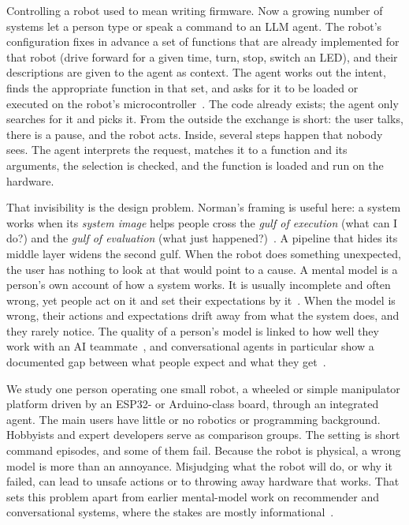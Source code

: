 \documentclass[sigconf]{acmart}
\begin{document}
Controlling a robot used to mean writing firmware. Now a growing number of systems let a person type or speak a command to an LLM agent. The robot's configuration fixes in advance a set of functions that are already implemented for that robot (drive forward for a given time, turn, stop, switch an LED), and their descriptions are given to the agent as context. The agent works out the intent, finds the appropriate function in that set, and asks for it to be loaded or executed on the robot's microcontroller~\cite{ahn2022saycan, vemprala2024chatgpt}. The code already exists; the agent only searches for it and picks it. From the outside the exchange is short: the user talks, there is a pause, and the robot acts. Inside, several steps happen that nobody sees. The agent interprets the request, matches it to a function and its arguments, the selection is checked, and the function is loaded and run on the hardware.

That invisibility is the design problem. Norman's framing is useful here: a system works when its \emph{system image} helps people cross the \emph{gulf of execution} (what can I do?) and the \emph{gulf of evaluation} (what just happened?)~\cite{hutchins1985direct, norman2013design}. A pipeline that hides its middle layer widens the second gulf. When the robot does something unexpected, the user has nothing to look at that would point to a cause. A mental model is a person's own account of how a system works. It is usually incomplete and often wrong, yet people act on it and set their expectations by it~\cite{norman1983some, kieras1984role, johnsonlaird1983mental, gero2020mental}. When the model is wrong, their actions and expectations drift away from what the system does, and they rarely notice. The quality of a person's model is linked to how well they work with an AI teammate~\cite{bansal2019beyond}, and conversational agents in particular show a documented gap between what people expect and what they get~\cite{luger2016like}.

We study one person operating one small robot, a wheeled or simple manipulator platform driven by an ESP32- or Arduino-class board, through an integrated agent. The main users have little or no robotics or programming background. Hobbyists and expert developers serve as comparison groups. The setting is short command episodes, and some of them fail. Because the robot is physical, a wrong model is more than an annoyance. Misjudging what the robot will do, or why it failed, can lead to unsafe actions or to throwing away hardware that works. That sets this problem apart from earlier mental-model work on recommender and conversational systems, where the stakes are mostly informational~\cite{eslami2015always, eslami2016first, gero2020mental}.
\end{document}
